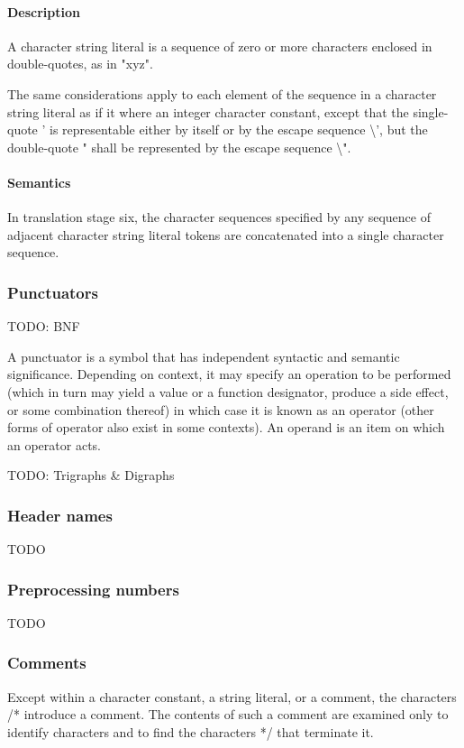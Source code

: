 \documentclass{article}
\begin{document}
\paragraph*{Description}
A character string literal is a sequence of zero or more characters enclosed in 
double-quotes, as in "xyz".
\linebreak

The same considerations apply to each element of the sequence in a character string
literal as if it where an integer character constant, except that the single-quote 
' is representable either by itself or by the escape sequence \textbackslash', but 
the double-quote " shall be represented by the escape sequence \textbackslash".

\paragraph*{Semantics}
In translation stage six, the character sequences specified by any sequence of adjacent 
character string literal tokens are concatenated into a single character sequence.

\subsubsection{Punctuators}
TODO: BNF

A punctuator is a symbol that has independent syntactic and semantic significance. 
Depending on context, it may specify an operation to be performed (which in turn 
may yield a value or a function designator, produce a side effect, or some combination 
thereof) in which case it is known as an operator (other forms of operator also exist 
in some contexts). An operand is an item on which an operator acts.
\linebreak

TODO: Trigraphs \& Digraphs

\subsubsection{Header names}
TODO
\subsubsection{Preprocessing numbers}
TODO
\subsubsection{Comments}
Except within a character constant, a string literal, or a comment, the characters /* 
introduce a comment.  The contents of such a comment are examined only to identify 
characters and to find the characters */ that terminate it.
\linebreak
\end{document}
